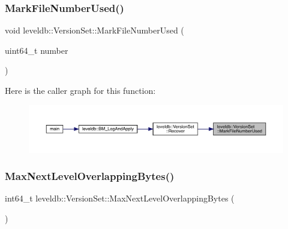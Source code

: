 \mbox{\label{classleveldb_1_1_version_set_a8a009a58938b12c7a69bda2b4da115a0}} 
\subsubsection{\texorpdfstring{MarkFileNumberUsed()}{MarkFileNumberUsed()}}
{\footnotesize\ttfamily void leveldb\+::\+Version\+Set\+::\+Mark\+File\+Number\+Used (\begin{DoxyParamCaption}\item[{uint64\+\_\+t}]{number }\end{DoxyParamCaption})}

Here is the caller graph for this function\+:
\nopagebreak
\begin{figure}[H]
\begin{center}
\leavevmode
\includegraphics[width=350pt]{classleveldb_1_1_version_set_a8a009a58938b12c7a69bda2b4da115a0_icgraph}
\end{center}
\end{figure}
\mbox{\label{classleveldb_1_1_version_set_a32dc1a7e1eaeeeac89286be3483ad612}} 
\subsubsection{\texorpdfstring{MaxNextLevelOverlappingBytes()}{MaxNextLevelOverlappingBytes()}}
{\footnotesize\ttfamily int64\+\_\+t leveldb\+::\+Version\+Set\+::\+Max\+Next\+Level\+Overlapping\+Bytes (\begin{DoxyParamCaption}{ }\end{DoxyParamCaption})}

